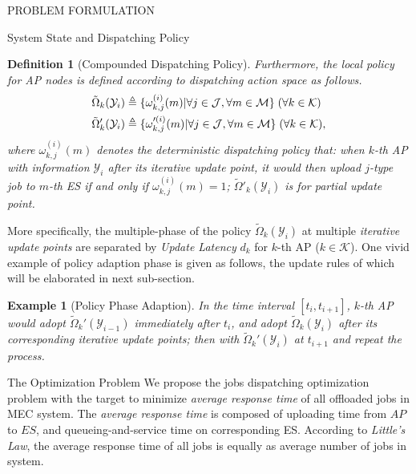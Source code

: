 \documentclass[10pt, conference, letterpaper]{IEEEtran}
\newtheorem{definition}{Definition}
\newtheorem{example}{Example}
\newcommand{\define}{\triangleq}
\DeclarePairedDelimiter{\set}{\{}{\}}
\newcommand{\apSet}{\mathcal{K}}
\newcommand{\esSet}{\mathcal{M}}
\newcommand{\jSpace}{\mathcal{J}}
\newcommand{\Obsv}{\mathcal{Y}}
\begin{document}
\begin{section}{PROBLEM FORMULATION}
\begin{subsection}{System State and Dispatching Policy}
\begin{definition}[Compounded Dispatching Policy]
                Furthermore, the local policy for AP nodes is defined according to \emph{dispatching action space} as follows.
                \begin{align}
                    &\tilde{\Omega}_{k}(\Obsv_{i}) \define \set{\omega^{(i)}_{k,j}(m)|\forall j\in\jSpace, \forall m\in\esSet}
                    \;(\forall k\in\apSet)
                    \\
                    &\tilde{\Omega}'_{k}(\Obsv_{i}) \define \set{\omega'^{(i)}_{k,j}(m)|\forall j\in\jSpace, \forall m\in\esSet}
                    \;(\forall k\in\apSet),
                \end{align}
                where $\omega^{(i)}_{k,j}(m)$ denotes the deterministic dispatching policy that: when $k$-th AP with information $\Obsv_{i}$ after its iterative update point, it would then upload $j$-type job to $m$-th ES if and only if $\omega^{(i)}_{k,j}(m)=1$; $\tilde{\Omega}'_{k}(\Obsv_i)$ is for partial update point.
            \end{definition}

            More specifically, the multiple-phase of the policy $\tilde{\Omega}_k(\Obsv_i)$ at multiple \emph{iterative update points} are separated by \emph{Update Latency} $d_{k}$ for $k$-th AP ($k\in\apSet$). One vivid example of policy adaption phase is given as follows, the update rules of which will be elaborated in next sub-section.
            \begin{example}[Policy Phase Adaption]
                In the time interval $[t_{i}, t_{i+1}]$, $k$-th AP would adopt $\tilde{\Omega}_{k}'(\Obsv_{i-1})$ immediately after $t_i$, and adopt $\tilde{\Omega}_{k}(\Obsv_{i})$ after its corresponding iterative update points; then with $\tilde{\Omega}_{k}'(\Obsv_{i})$ at $t_{i+1}$ and repeat the process.
            \end{example}
        \end{subsection}

        \begin{subsection}{The Optimization Problem}
            We propose the jobs dispatching optimization problem with the target to minimize \emph{average response time} of all offloaded jobs in MEC system.
            The \emph{average response time} is composed of uploading time from $AP$ to $ES$, and queueing-and-service time on corresponding ES. According to \emph{Little's Law}, the average response time of all jobs is equally as average number of jobs in system.
            

\end{subsection}
\end{section}
\end{document}
